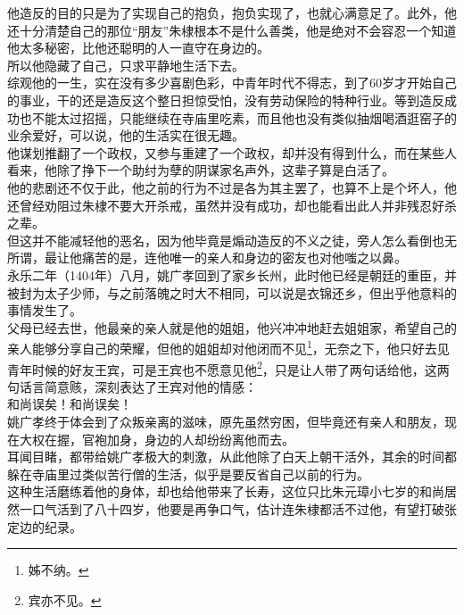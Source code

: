 \begin{multicols}{\theparacolNo}
他造反的目的只是为了实现自己的抱负，抱负实现了，也就心满意足了。此外，他还十分清楚自己的那位“朋友”朱棣根本不是什么善类，他是绝对不会容忍一个知道他太多秘密，比他还聪明的人一直守在身边的。\\

所以他隐藏了自己，只求平静地生活下去。\\

综观他的一生，实在没有多少喜剧色彩，中青年时代不得志，到了60岁才开始自己的事业，干的还是造反这个整日担惊受怕，没有劳动保险的特种行业。等到造反成功也不能太过招摇，只能继续在寺庙里吃素，而且他也没有类似抽烟喝酒逛窑子的业余爱好，可以说，他的生活实在很无趣。\\

他谋划推翻了一个政权，又参与重建了一个政权，却并没有得到什么，而在某些人看来，他除了挣下一个助纣为孽的阴谋家名声外，这辈子算是白活了。\\

他的悲剧还不仅于此，他之前的行为不过是各为其主罢了，也算不上是个坏人，他还曾经劝阻过朱棣不要大开杀戒，虽然并没有成功，却也能看出此人并非残忍好杀之辈。\\

但这并不能减轻他的恶名，因为他毕竟是煽动造反的不义之徒，旁人怎么看倒也无所谓，最让他痛苦的是，连他唯一的亲人和身边的密友也对他嗤之以鼻。\\

永乐二年（1404年）八月，姚广孝回到了家乡长州，此时他已经是朝廷的重臣，并被封为太子少师，与之前落魄之时大不相同，可以说是衣锦还乡，但出乎他意料的事情发生了。\\

父母已经去世，他最亲的亲人就是他的姐姐，他兴冲冲地赶去姐姐家，希望自己的亲人能够分享自己的荣耀，但他的姐姐却对他闭而不见\footnote{姊不纳。}，无奈之下，他只好去见青年时候的好友王宾，可是王宾也不愿意见他\footnote{宾亦不见。}，只是让人带了两句话给他，这两句话言简意赅，深刻表达了王宾对他的情感：\\

和尚误矣！和尚误矣！\\

姚广孝终于体会到了众叛亲离的滋味，原先虽然穷困，但毕竟还有亲人和朋友，现在大权在握，官袍加身，身边的人却纷纷离他而去。\\

耳闻目睹，都带给姚广孝极大的刺激，从此他除了白天上朝干活外，其余的时间都躲在寺庙里过类似苦行僧的生活，似乎是要反省自己以前的行为。\\

这种生活磨练着他的身体，却也给他带来了长寿，这位只比朱元璋小七岁的和尚居然一口气活到了八十四岁，他要是再争口气，估计连朱棣都活不过他，有望打破张定边的纪录。\\


\end{multicols}
